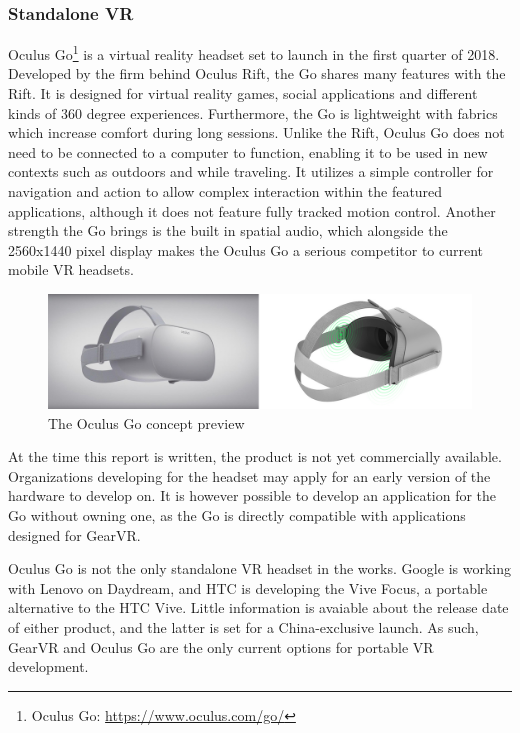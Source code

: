 			\subsubsection{Standalone VR}
			Oculus Go\footnote{Oculus Go: \url{https://www.oculus.com/go/}} is a virtual reality headset set to launch in the first quarter of 2018. Developed by the firm behind Oculus Rift, the Go shares many features with the Rift. It is designed for virtual reality games, social applications and different kinds of 360 degree experiences. Furthermore, the Go is lightweight with fabrics which increase comfort during long sessions. Unlike the Rift, Oculus Go does not need to be connected to a computer to function, enabling it to be used in new contexts such as outdoors and while traveling. It utilizes a simple controller for navigation and action to allow complex interaction within the featured applications, although it does not feature fully tracked motion control. Another strength the Go brings is the built in spatial audio, which alongside the 2560x1440 pixel display makes the Oculus Go a serious competitor to current mobile VR headsets.   \\
			\begin{figure}[H]
				\centering
				\includegraphics[width=1.0\linewidth]{figure/Analysis/oculusgo}
				\caption{The Oculus Go concept preview}
				\label{fig:Oculus}
			\end{figure}
			
			At the time this report is written, the product is not yet commercially available. Organizations developing for the headset may apply for an early version of the hardware to develop on. It is however possible to develop an application for the Go without owning one, as the Go is directly compatible with applications designed for GearVR. 
			
			Oculus Go is not the only standalone VR headset in the works. Google is working with Lenovo on Daydream, and HTC is developing the Vive Focus, a portable alternative to the HTC Vive. Little information is avaiable about the release date of either product, and the latter is set for a China-exclusive launch. As such, GearVR and Oculus Go are the only current options for portable VR development. 
						
